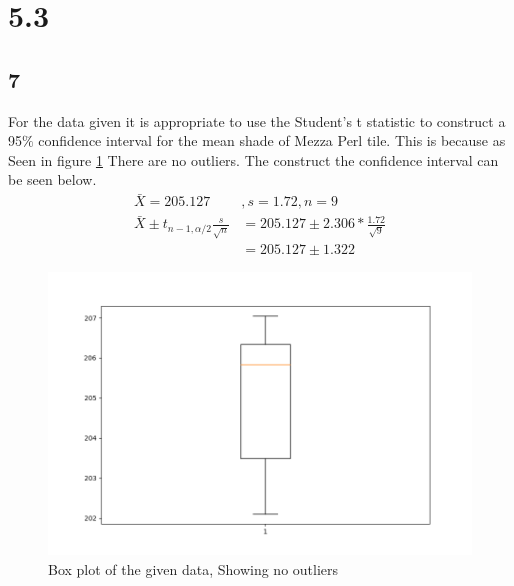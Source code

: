 \documentclass[12pt]{report}
\begin{document}
\section*{5.3}
   \subsection*{7}
   For the data given it is  appropriate to use the Student's t statistic to construct a 95$\%$ confidence interval for the mean shade of Mezza Perl tile. This is because as Seen in figure \ref{fig:1} There are no outliers. The construct the confidence interval can be seen below.
   \begin{align*}
   \bar{X}=205.127&,s=1.72,n=9\\
   \bar{X}\pm t_{n-1,\alpha/2}\frac{s}{\sqrt{n}}&=205.127\pm2.306*\frac{1.72}{\sqrt{9}}\\
                                              &=205.127\pm1.322
   \end{align*}
   \begin{figure}[H]
	\begin{center}
		\includegraphics[width=.70\textwidth]{HW10boxplot.png}
	\end{center}
	\caption{Box plot of the given data, Showing no outliers}
   \label{fig:1}
\end{figure}
   
\end{document}
